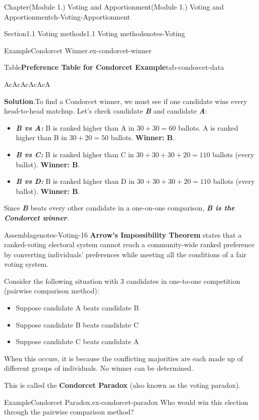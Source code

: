 \documentclass[oneside,10pt,]{book}
\newcommand{\blocktitlefont}{\relax}
\newcommand{\ptxlistdisc}{\raisebox{0.3ex}{\textbullet}}
\newcommand{\alert}[1]{\textbf{\textit{#1}}}
\newcommand{\terminology}[1]{\textbf{#1}}
\begin{document}
\begin{chapterptx}{Chapter}{(Module 1.) Voting and Apportionment}{}{(Module 1.) Voting and Apportionment}{}{}{ch-Voting-Apportionment}
\begin{sectionptx}{Section}{1.1 Voting methods}{}{1.1 Voting methods}{}{}{notes-Voting}
\begin{example}{Example}{Condorcet Winner.}{ex-condorcet-winner}
\begin{tableptx}{Table}{\textbf{Preference Table for Condorcet Example}}{tab-condorcet-data}{}
{\begin{tabular}{AcAcAcAcAcA}
\end{tabular}
}%
\end{tableptx}%
\par\smallskip%
\noindent\textbf{\blocktitlefont Solution}.\hypertarget{ex-condorcet-winner-3}{}\quad{}To find a Condorcet winner, we must see if one candidate wins every head-to-head matchup. Let's check candidate \alert{B} and candidate \alert{A}:%
%
\begin{itemize}[label=\ptxlistdisc]
\item{}\alert{B vs A:} B is ranked higher than A in \(30 + 30 = 60\) ballots. A is ranked higher than B in \(30 + 20 = 50\) ballots. \terminology{Winner: B}.%
\item{}\alert{B vs C:} B is ranked higher than C in \(30 + 30 + 30 + 20 = 110\) ballots (every ballot). \terminology{Winner: B}.%
\item{}\alert{B vs D:} B is ranked higher than D in \(30 + 30 + 30 + 20 = 110\) ballots (every ballot). \terminology{Winner: B}.%
\end{itemize}
Since \alert{B} beats every other candidate in a one-on-one comparison, \alert{B is the Condorcet winner}.%
\end{example}
\begin{assemblage}{Assemblage}{}{notes-Voting-16}%
\terminology{Arrow's Impossibility Theorem} states that a ranked-voting electoral system cannot reach a community-wide ranked preference by converting individuals' preferences while meeting all the conditions of a fair voting system.%
\par
Consider the following situation with 3 candidates in one-to-one competition (pairwise comparison method):%
\begin{itemize}[label=\ptxlistdisc]
\item{}Suppose candidate A beats candidate B%
\item{}Suppose candidate B beats candidate C%
\item{}Suppose candidate C beats candidate A%
\end{itemize}
%
\par
When this occurs, it is because the conflicting majorities are each made up of different groups of individuals. No winner can be determined.%
\par
This is called the \terminology{Condorcet Paradox} (also known as the voting paradox).%
\end{assemblage}
\begin{example}{Example}{Condorcet Paradox.}{ex-condorcet-paradox}%
Who would win this election through the pairwise comparison method?%

\end{example}
\end{sectionptx}
\end{chapterptx}
\end{document}
